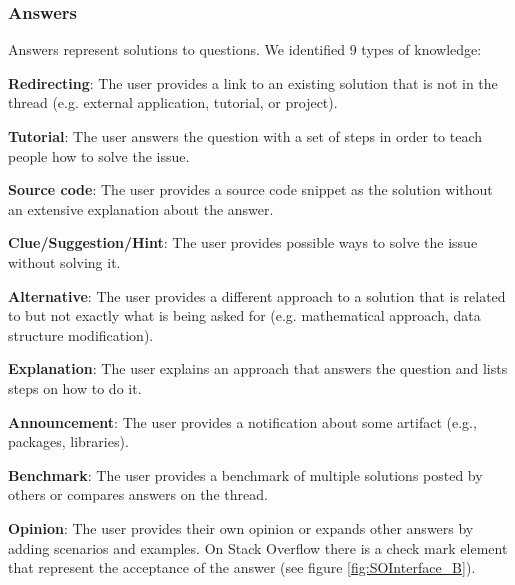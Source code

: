 \documentclass{sig-alternate-05-2015}
\begin{document}

\subsubsection{Answers}

	Answers represent solutions to questions.
	We identified 9 types of knowledge:
	\begin{packed_enum}
	\item \textbf{Redirecting}: The user provides a link to an existing solution that is not in the thread (e.g. external application, tutorial, or project).
	\item \textbf{Tutorial}: The user answers the question with a set of steps in order to teach people how to solve the issue.
	\item \textbf{Source code}: The user provides a source code snippet as the solution without an extensive explanation about the answer.
	\item \textbf{Clue/Suggestion/Hint}: The user provides possible ways to solve the issue without solving it.
	\item \textbf{Alternative}: The user provides a different approach to a solution that is related to but not exactly what is being asked for (e.g. mathematical approach, data structure modification).
	\item \textbf{Explanation}: The user explains an approach that answers the question and lists steps on how to do it.
	\item \textbf{Announcement}: The user provides a notification about some artifact (e.g., packages, libraries).
	\item \textbf{Benchmark}: The user provides a benchmark of multiple solutions posted by others or compares answers on the thread.
	\item \textbf{Opinion}: The user provides their own opinion or expands other answers by adding scenarios and examples.
    On Stack Overflow there is a check mark element that represent the acceptance of the answer (see figure \ref{fig:SOInterface_B}).
	\end{packed_enum}
\end{document}
